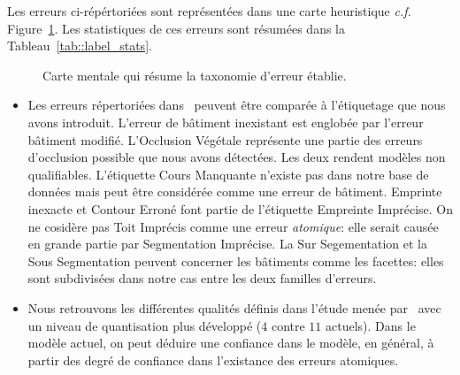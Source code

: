 \documentclass[a4paper,french]{article}
\begin{document}
    Les erreurs ci-répértoriées sont représentées dans une carte heuristique \textit{c.f.} Figure~\ref{fig::mindmap_errors}. Les statistiques de ces erreurs sont résumées dans la Tableau~\ref{tab::label_stats}.


    \begin{figure}[h!]
        \begin{center}
            
            \caption{\label{fig::mindmap_errors} Carte mentale qui résume la taxonomie d'erreur établie.}
        \end{center}
    \end{figure}

    \begin{itemize}
        \item Les erreurs répertoriées dans~\cite{Michelin2013} peuvent être comparée à l'étiquetage que nous avons introduit. L'erreur de bâtiment inexistant est englobée par l'erreur bâtiment modifié. L'Occlusion Végétale représente une partie des erreurs d'occlusion possible que nous avons détectées. Les deux rendent modèles non qualifiables. L'étiquette Cours Manquante n'existe pas dans notre base de données mais peut être considérée comme une erreur de bâtiment. Emprinte inexacte et Contour Erroné font partie de l'étiquette Empreinte Imprécise. On ne cosidère pas Toit Imprécis comme une erreur \emph{atomique}: elle serait causée en grande partie par Segmentation Imprécise. La Sur Segementation et la Sous Segmentation peuvent concerner les bâtiments comme les facettes: elles sont subdivisées dans notre cas entre les deux familles d'erreurs.
        \item Nous retrouvons les différentes qualités définis dans l'étude menée par~\cite{Boudet2006} avec un niveau de quantisation plus développé ($4$ contre $11$ actuels). Dans le modèle actuel, on peut déduire une confiance dans le modèle, en général, à partir des degré de confiance dans l'existance des erreurs atomiques.
    \end{itemize}
\end{document}
